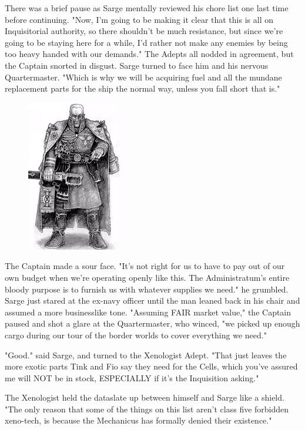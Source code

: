 There was a brief pause as Sarge mentally reviewed his chore list one last time before continuing. 
"Now, I'm going to be making it clear that this is all on Inquisitorial authority, so there shouldn't be much resistance, but since we're going to be staying here for a while, I'd rather not make any enemies by being too heavy handed with our demands." The Adepts all nodded in agreement, but the Captain snorted in disgust. 
Sarge turned to face him and his nervous Quartermaster. 
"Which is why we will be acquiring fuel and all the mundane replacement parts for the ship the normal way, unless you fall short that is."

\begin{figure}
	\begin{center}
		\includegraphics[width=\figwidth]{pics/14/3.png}
	\end{center}
\end{figure}
The Captain made a sour face. 
"It's not right for us to have to pay out of our own budget when we're operating openly like this. 
The Administratum's entire bloody purpose is to furnish us with whatever supplies we need." he grumbled. 
Sarge just stared at the ex-navy officer until the man leaned back in his chair and assumed a more businesslike tone. 
"Assuming FAIR market value," the Captain paused and shot a glare at the Quartermaster, who winced, "we picked up enough cargo during our tour of the border worlds to cover everything we need."

"Good." said Sarge, and turned to the Xenologist Adept. 
"That just leaves the more exotic parts Tink and Fio say they need for the Cells, which you've assured me will NOT be in stock, ESPECIALLY if it's the Inquisition asking."

The Xenologist held the dataslate up between himself and Sarge like a shield. 
"The only reason that some of the things on this list aren't class five forbidden xeno-tech, is because the Mechanicus has formally denied their existence."

